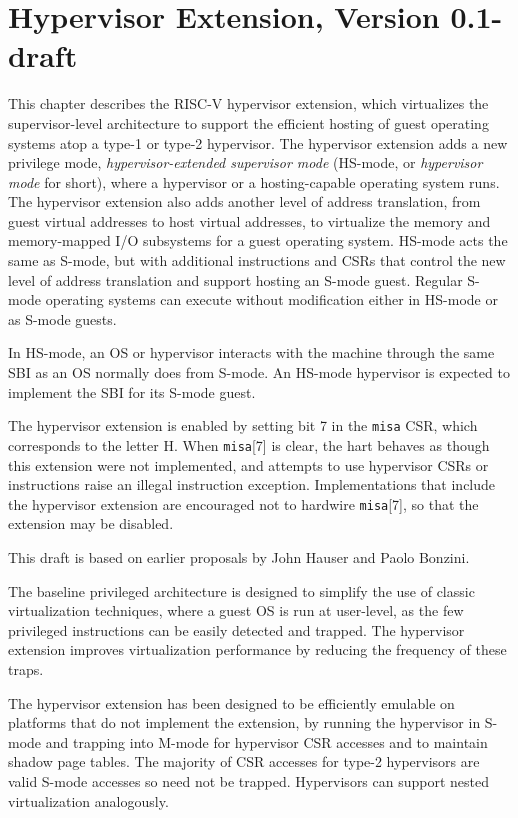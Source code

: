 \chapter{Hypervisor Extension, Version 0.1-draft}
\label{hypervisor}

This chapter describes the RISC-V hypervisor extension, which virtualizes the
supervisor-level architecture to support the efficient hosting of guest
operating systems atop a type-1 or type-2 hypervisor.
The hypervisor extension adds a new privilege
mode, {\em hypervisor-extended supervisor mode} (HS-mode, or {\em hypervisor
mode} for short), where a hypervisor or a hosting-capable operating system
runs.  The hypervisor extension also adds another level of address translation,
from guest virtual addresses to host virtual addresses, to virtualize the
memory and memory-mapped I/O subsystems for a guest operating system.  HS-mode
acts the same as S-mode, but with additional instructions and CSRs that control
the new level of address translation and support hosting an S-mode guest.
Regular S-mode operating systems can execute without modification either in
HS-mode or as S-mode guests.

In HS-mode, an OS or hypervisor interacts with the machine through the same
SBI as an OS normally does from S-mode.  An HS-mode hypervisor is expected to
implement the SBI for its S-mode guest.

The hypervisor extension is enabled by setting bit 7 in the {\tt misa} CSR,
which corresponds to the letter H.  When {\tt misa}[7] is clear, the hart
behaves as though this extension were not implemented, and attempts to use
hypervisor CSRs or instructions raise an illegal instruction exception.
Implementations that include the hypervisor extension are encouraged
not to hardwire {\tt misa}[7], so that the extension may be disabled.

\begin{commentary}
This draft is based on earlier proposals by John Hauser and Paolo Bonzini.
\end{commentary}

\begin{commentary}
The baseline privileged architecture is designed to simplify the use of classic
virtualization techniques, where a guest OS is run at user-level, as
the few privileged instructions can be easily detected and trapped.
The hypervisor extension improves virtualization performance by
reducing the frequency of these traps.

The hypervisor extension has been designed to be efficiently
emulable on platforms that do not implement the extension, by running
the hypervisor in S-mode and trapping into M-mode for hypervisor CSR accesses
and to maintain shadow page tables.  The majority of CSR accesses for
type-2 hypervisors are valid S-mode accesses so need not be trapped.
Hypervisors can support nested virtualization analogously.
\end{commentary}

